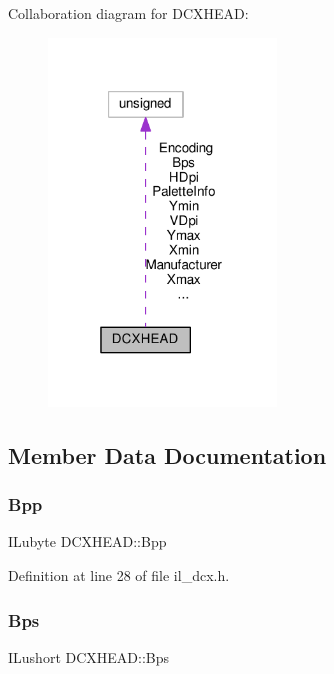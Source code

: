 Collaboration diagram for D\+C\+X\+H\+E\+AD\+:
\nopagebreak
\begin{figure}[H]
\begin{center}
\leavevmode
\includegraphics[width=172pt]{d2/da7/structDCXHEAD__coll__graph}
\end{center}
\end{figure}


\subsection{Member Data Documentation}
\mbox{\label{structDCXHEAD_a43ee466650d9a214042db5471445eced}} 
\subsubsection{\texorpdfstring{Bpp}{Bpp}}
{\footnotesize\ttfamily I\+Lubyte D\+C\+X\+H\+E\+A\+D\+::\+Bpp}



Definition at line 28 of file il\+\_\+dcx.\+h.

\mbox{\label{structDCXHEAD_a5fa048ccf365b538614025a634f51a2b}} 
\subsubsection{\texorpdfstring{Bps}{Bps}}
{\footnotesize\ttfamily I\+Lushort D\+C\+X\+H\+E\+A\+D\+::\+Bps}



